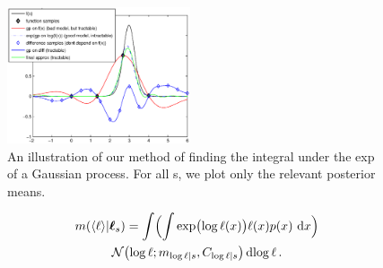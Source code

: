 \documentclass{article}
\begin{document}
 \begin{figure}
 \centering
 \includegraphics[width=0.48\textwidth]{figures/log_gp_diff.eps}
 \caption{An illustration of our method of finding the integral under the exp of a Gaussian process. For all \gp s, we plot only the relevant posterior means.}
 \label{fig:integrate_hypers}
 \end{figure}


%
%
%
\begin{multline}\label{eq:minty_l}
\mean{\inty{\lfn}}{\vr_s}
 =\int \Bigl( \int \exp\bigl(\tr(\lfv)\bigr)\lfn(\lfv)\po{\lfv}\,\ud\lfv\Bigr)\\
\N{\tr}{\meancondfn{\tr}{s}}{C_{\tr|s}} \ud \tr\,.
\end{multline}
\end{document}

